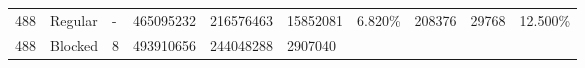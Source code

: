 \documentclass[11pt]{article}
\begin{document}
\begin{longtable}[]{@{}llllllllll@{}}
\begin{minipage}[t]{0.09\columnwidth}
488\strut
\end{minipage} & \begin{minipage}[t]{0.06\columnwidth}\raggedright\strut
Regular\strut
\end{minipage} & \begin{minipage}[t]{0.09\columnwidth}\raggedright\strut
-\strut
\end{minipage} & \begin{minipage}[t]{0.07\columnwidth}\raggedright\strut
465095232\strut
\end{minipage} & \begin{minipage}[t]{0.06\columnwidth}\raggedright\strut
216576463\strut
\end{minipage} & \begin{minipage}[t]{0.07\columnwidth}\raggedright\strut
15852081\strut
\end{minipage} & \begin{minipage}[t]{0.07\columnwidth}\raggedright\strut
6.820\%\strut
\end{minipage} & \begin{minipage}[t]{0.06\columnwidth}\raggedright\strut
208376\strut
\end{minipage} & \begin{minipage}[t]{0.07\columnwidth}\raggedright\strut
29768\strut
\end{minipage} & \begin{minipage}[t]{0.07\columnwidth}\raggedright\strut
12.500\%\strut
\end{minipage}\tabularnewline
\begin{minipage}[t]{0.09\columnwidth}\raggedright\strut
488\strut
\end{minipage} & \begin{minipage}[t]{0.06\columnwidth}\raggedright\strut
Blocked\strut
\end{minipage} & \begin{minipage}[t]{0.09\columnwidth}\raggedright\strut
8\strut
\end{minipage} & \begin{minipage}[t]{0.07\columnwidth}\raggedright\strut
493910656\strut
\end{minipage} & \begin{minipage}[t]{0.06\columnwidth}\raggedright\strut
244048288\strut
\end{minipage} & \begin{minipage}[t]{0.07\columnwidth}\raggedright\strut
2907040\strut
\end{minipage} & \begin{minipage}[t]{0.07\columnwidth}\raggedright\strut

\end{minipage}
\end{longtable}
\end{document}
